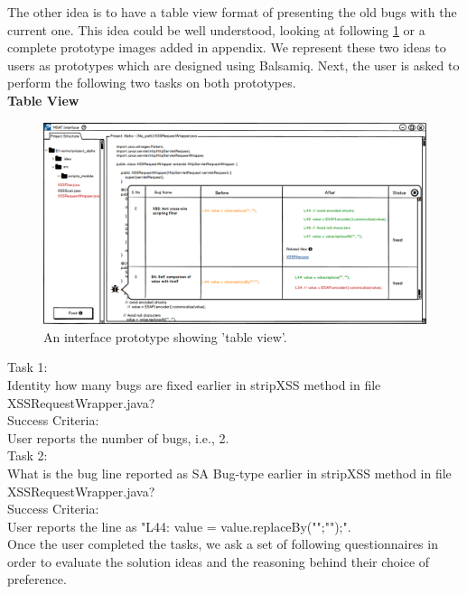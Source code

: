 The other idea is to have a table view format of presenting the old bugs with the current one. This idea could be well understood, looking at following \ref{fig:S33_table} or a complete prototype images added in appendix. We represent these two ideas to users as prototypes which are designed using Balsamiq. Next, the user is asked to perform the following two tasks on both prototypes. \\

\textbf{Table View}
\begin{figure}[hbt!]
	\centering
	\includegraphics[width=\linewidth]{figures/solution_ideas_snaps/S33_table}
	\caption{An interface prototype showing 'table view'.}
	\label{fig:S33_table}
\end{figure}

Task 1: \\ 

Identity how many bugs are fixed earlier in stripXSS method in file XSSRequestWrapper.java? \\

Success Criteria: \\

User reports the number of bugs, i.e., 2. \\

Task 2: \\

What is the bug line reported as SA Bug-type earlier in stripXSS method in file XSSRequestWrapper.java? \\

Success Criteria: \\
 
User reports the line as "L44: value = value.replaceBy("";"");". \\

Once the user completed the tasks, we ask a set of following questionnaires in order to evaluate the solution ideas and the reasoning behind their choice of preference. \\

